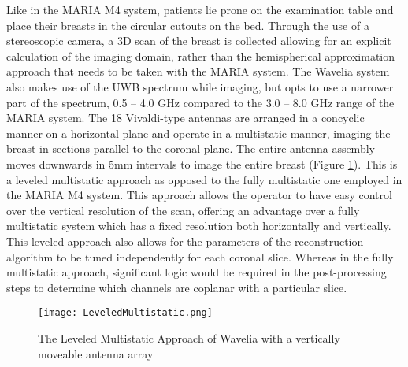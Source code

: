 Like in the MARIA M4 system, patients lie prone on the examination table and place their breasts in the circular cutouts
on the bed. Through the use of a stereoscopic camera, a 3D scan of the breast is collected allowing for an explicit
calculation of the imaging domain, rather than the hemispherical approximation approach that needs to be taken with the
MARIA system. The Wavelia system also makes use of the UWB spectrum while imaging, but opts to use a narrower part of
the spectrum, 0.5 -- 4.0 GHz compared to the 3.0 -- 8.0 GHz range of the MARIA system. The 18 Vivaldi-type antennas are
arranged in a concyclic manner on a horizontal plane and operate in a multistatic manner, imaging the breast in sections
parallel to the coronal plane. The entire antenna assembly moves downwards in 5mm intervals to image the entire breast
(Figure \ref{fig:LeveledMultistaticExample}). This is a leveled multistatic approach as opposed to the fully multistatic
one employed in the MARIA M4 system. This approach allows the operator to have easy control over the vertical resolution
of the scan, offering an advantage over a fully multistatic system which has a fixed resolution both horizontally and
vertically. This leveled approach also allows for the parameters of the reconstruction algorithm to be tuned independently
for each coronal slice. Whereas in the fully multistatic approach, significant logic would be required in the
post-processing steps to determine which channels are coplanar with a particular slice. 
\begin{figure}
    \texttt{[image: LeveledMultistatic.png]}
    \centering
    \caption{The Leveled Multistatic Approach of Wavelia with a vertically moveable antenna array \cite{moloneyWaveliaMicrowaveBreast2021}}
    \label{fig:LeveledMultistaticExample}
\end{figure}

